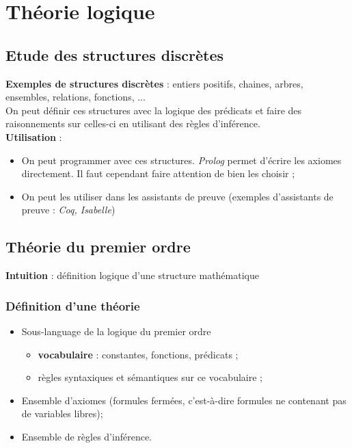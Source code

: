 \chapter{Théorie logique}
\section{Etude des structures discrètes}
\noindent
\textbf{Exemples de structures discrètes} : entiers positifs, chaines, arbres, ensembles, relations, fonctions, ...\\

On peut définir ces structures avec la logique des prédicats et faire des raisonnements sur celles-ci en utilisant des règles d'inférence.\\

\noindent
\textbf{Utilisation} :\begin{itemize}
\item On peut programmer avec ces structures. \textit{Prolog} permet d'écrire les axiomes directement. Il faut cependant faire attention de bien les choisir ;
\item On peut les utiliser dans les assistants de preuve (exemples d'assistants de preuve : \textit{Coq, Isabelle})\\
\end{itemize}

\section{Théorie du premier ordre}
\noindent
\textbf{Intuition} : définition logique d'une structure mathématique

\noindent
\subsection{Définition d'une théorie}
\begin{itemize}
\item Sous-language de la logique du premier ordre
\begin{itemize}
\item \textbf{vocabulaire} : constantes, fonctions, prédicats ;
\item règles syntaxiques et sémantiques sur ce vocabulaire ;
\end{itemize}
\item Ensemble d'axiomes (formules fermées, c'est-à-dire formules ne contenant pas de variables libres);
\item Ensemble de règles d'inférence.
\end{itemize}

